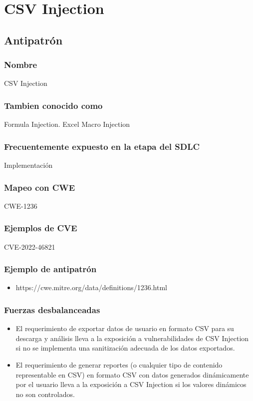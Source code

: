 \chapter{CSV Injection}
\section{Antipatrón}
\subsection{Nombre}
 CSV Injection 
\subsection{Tambien conocido como}
Formula Injection. Excel Macro Injection	
\subsection{Frecuentemente expuesto en la etapa del SDLC}
Implementación
\subsection{Mapeo con CWE}
CWE-1236
\subsection{Ejemplos de CVE}
CVE-2022-46821

\subsection{Ejemplo de antipatrón}
\begin{itemize}
    \item https://cwe.mitre.org/data/definitions/1236.html
\end{itemize}
\subsection{Fuerzas desbalanceadas}
\begin{itemize}
    \item El requerimiento de exportar datos de usuario en formato CSV para su descarga y análisis lleva a la exposición a vulnerabilidades de CSV Injection si no se implementa una sanitización adecuada de los datos exportados.
    \item El requerimiento de generar reportes (o cualquier tipo de contenido representable en CSV) en formato CSV con datos generados dinámicamente por el usuario lleva a la exposición a CSV Injection si  los valores dinámicos no son controlados.
\end{itemize}
